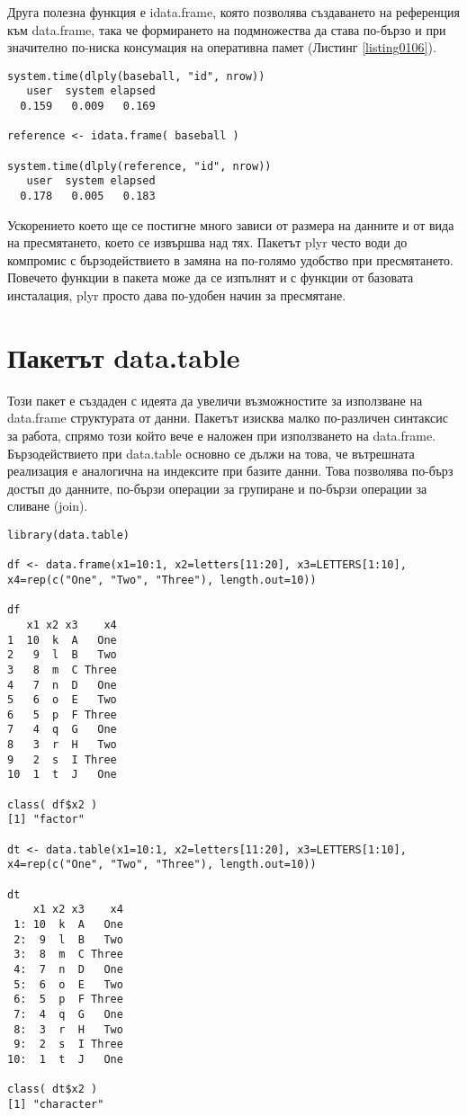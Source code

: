 Друга полезна функция е idata.frame, която позволява създаването на референция към data.frame, така че формирането на подмножества да става по-бързо и при значително по-ниска консумация на оперативна памет (Листинг \ref{listing0106}). 

\begin{lstlisting}[caption=Бързодействие при използване на референции, label=listing0106]
system.time(dlply(baseball, "id", nrow))
   user  system elapsed 
  0.159   0.009   0.169 

reference <- idata.frame( baseball )

system.time(dlply(reference, "id", nrow))
   user  system elapsed 
  0.178   0.005   0.183
\end{lstlisting}

Ускорението което ще се постигне много зависи от размера на данните и от вида на пресмятането, което се извършва над тях. Пакетът plyr често води до компромис с бързодействието в замяна на по-голямо удобство при пресмятането. Повечето функции в пакета може да се изпълнят и с функции от базовата инсталация, plyr просто дава по-удобен начин за пресмятане. 

\section{Пакетът data.table}

Този пакет е създаден с идеята да увеличи възможностите за използване на data.frame структурата от данни. Пакетът изисква малко по-различен синтаксис за работа, спрямо този който вече е наложен при използването на data.frame. Бързодействието при data.table основно се дължи на това, че вътрешната реализация е аналогична на индексите при базите данни. Това позволява по-бърз достъп до данните, по-бързи операции за групиране и по-бързи операции за сливане (join). 

\begin{lstlisting}[caption=Създаване на data.table, label=listing0107]
library(data.table)

df <- data.frame(x1=10:1, x2=letters[11:20], x3=LETTERS[1:10], x4=rep(c("One", "Two", "Three"), length.out=10))
 
df
   x1 x2 x3    x4
1  10  k  A   One
2   9  l  B   Two
3   8  m  C Three
4   7  n  D   One
5   6  o  E   Two
6   5  p  F Three
7   4  q  G   One
8   3  r  H   Two
9   2  s  I Three
10  1  t  J   One

class( df$x2 )
[1] "factor"

dt <- data.table(x1=10:1, x2=letters[11:20], x3=LETTERS[1:10], x4=rep(c("One", "Two", "Three"), length.out=10))
 
dt
    x1 x2 x3    x4
 1: 10  k  A   One
 2:  9  l  B   Two
 3:  8  m  C Three
 4:  7  n  D   One
 5:  6  o  E   Two
 6:  5  p  F Three
 7:  4  q  G   One
 8:  3  r  H   Two
 9:  2  s  I Three
10:  1  t  J   One

class( dt$x2 )
[1] "character"
\end{lstlisting}

